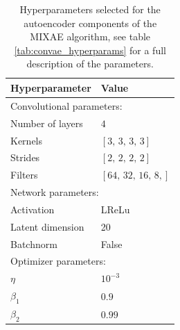 \documentclass[review,number,sort&compress]{elsarticle}
\begin{document}
\begin{table}[H]
\renewcommand*{\arraystretch}{0.5}
\centering
\caption{Hyperparameters selected for the autoencoder components of the MIXAE algorithm, see table \ref{tab:convae_hyperparams} for a full description of the parameters.}\label{tab:mixe_ae_hyperparams}
\setlength{\extrarowheight}{15pt}
\hspace*{-0.5in}
\begin{tabular}{ll}
\toprule
Hyperparameter & Value \\
\midrule
\multicolumn{2}{l}{Convolutional parameters: } \\
\midrule
Number of layers & $4$ \\
Kernels & $[3,\,3,\,3,\,3]$\\
Strides & $[2,\,2,\,2,\,2]$ \\
Filters & $[64,\, 32, \,16, \,8,]$ \\ 
\midrule
\multicolumn{2}{l}{Network parameters: } \\
\midrule
Activation & LReLu \\
Latent dimension & 20  \\
Batchnorm & False \\
\midrule
\multicolumn{2}{l}{Optimizer parameters: } \\
\midrule
$\eta$ & $10^{-3}$ \\
$\beta_1$ & $0.9$ \\
$\beta_2$ & $0.99$ \\
\bottomrule
\end{tabular}
\end{table}



\end{document}
